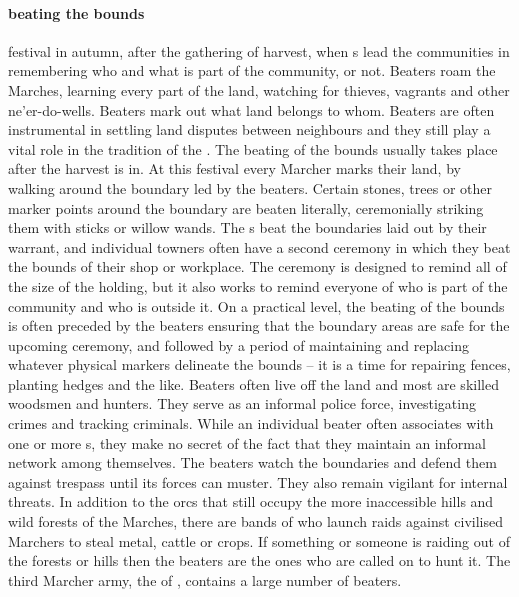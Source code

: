 \paragraph{beating the bounds} festival in autumn, after the gathering of harvest, when s lead the communities in remembering who and what is part of the community, or not. 
 Beaters roam the Marches, learning every part of the land, watching for thieves, vagrants and other ne'er-do-wells. Beaters mark out what land belongs to whom.  Beaters are often instrumental in settling land disputes between neighbours and they still play a vital role in the tradition of the . The beating of the bounds usually takes place after the harvest is in. At this festival every Marcher marks their land, by walking around the boundary led by the beaters. Certain stones, trees or other marker points around the boundary are beaten literally, ceremonially striking them with sticks or willow wands. The s beat the boundaries laid out by their warrant, and individual towners often have a second ceremony in which they beat the bounds of their shop or workplace. The ceremony is designed to remind all of the size of the holding, but it also works to remind everyone of who is part of the community and who is outside it. On a practical level, the beating of the bounds is often preceded by the beaters ensuring that the boundary areas are safe for the upcoming ceremony, and followed by a period of maintaining and replacing whatever physical markers delineate the bounds – it is a time for repairing fences, planting hedges and the like. Beaters often live off the land and most are skilled woodsmen and hunters. They serve as an informal police force, investigating crimes and tracking criminals. While an individual beater often associates with one or more s, they make no secret of the fact that they maintain an informal network among themselves. The beaters watch the boundaries and defend them against trespass until its forces can muster. They also remain vigilant for internal threats. In addition to the orcs that still occupy the more inaccessible hills and wild forests of the Marches, there are bands of  who launch raids against civilised Marchers to steal metal, cattle or crops. If something or someone is raiding out of the forests or hills then the beaters are the ones who are called on to hunt it. The third Marcher army, the  of , contains a large number of beaters. \bigparagraphendtwiddle
